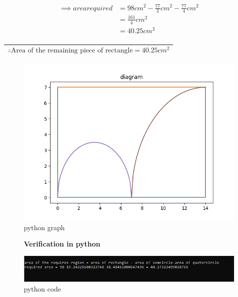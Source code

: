 \documentclass[journal,12pt,twocolumn]{IEEEtran}
\begin{document}
   
\begin{align*}
\implies area required &=98cm^{2} - \frac{77}{2}cm^{2} - \frac{77}{4}cm^{2}\\ 
&= \frac{161}{4}cm^{2} \\
&= 40.25cm^{2}  \\
    \end{align*}

\begin{center}
\renewcommand{\arraystretch}{1.1}
\begin{tabular}{|c|}
\hline
    $$ \therefore \text{Area of the remaining piece of rectangle} = 40.25cm^2 $$ &\\
\hline
\end{tabular}
\end{center}

\begin{figure}
    \centering
    \includegraphics[scale = 0.6]{Figure_2.png}
    \caption{python graph}
    \label{fig:my_pythondiagram}
\end{figure}

\begin{figure}
\begin{center}
\textbf{Verification in python}    
\end{center}
    \centering
    \includegraphics[scale = 0.75]{Figure_3.jpg}
    \caption{python code}
    \label{fig:my_codeverification}
\end{figure}
\end{document}
